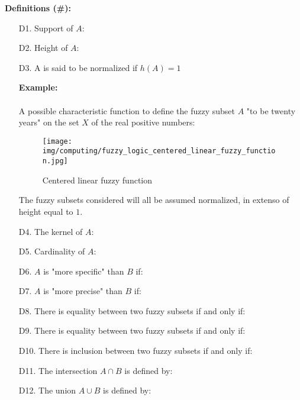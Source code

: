 	\pagebreak
	\textbf{Definitions (\#\mydef):}
	\begin{enumerate}
		\item[D1.] Support of $A$:
		

		\item[D2.] Height of $A$:
		

		\item[D3.] A is said to be normalized if $h(A)=1$
		\begin{tcolorbox}[colframe=black,colback=white,sharp corners]
		\textbf{{\Large {}}Example:}\\\\
		A possible characteristic function to define the fuzzy subset $A$ "to be twenty years" on the set $X$ of the real positive numbers:
		\begin{figure}[H]
			\centering
			\texttt{[image: img/computing/fuzzy\_logic\_centered\_linear\_fuzzy\_function.jpg]}
			\caption{Centered linear fuzzy function}
		\end{figure}
		\end{tcolorbox}
		\begin{tcolorbox}[title=Remark,colframe=black,arc=10pt]
		The fuzzy subsets considered will all be assumed normalized, in extenso of height equal to $1$.
		\end{tcolorbox}
		
		\item[D4.] The kernel of $A$:
		
	
		\item[D5.] Cardinality of $A$:
		
		
		\item[D6.] $A$ is "more specific" than $B$ if:
		
		
		\item[D7.] $A$ is "more precise" than $B$ if:
		
		
		\item[D8.] There is equality between two fuzzy subsets if and only if:
		
		\item[D9.] There is equality between two fuzzy subsets if and only if:
		
		
		\item[D10.] There is inclusion between two fuzzy subsets if and only if:
		
		
		\item[D11.] The intersection $A\cap B$ is defined by:
		
		
		\item[D12.] The union $A\cup B$ is defined by:
		
	\end{enumerate}
